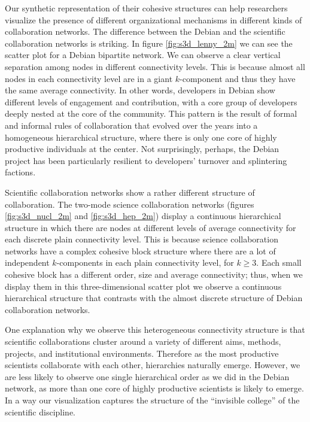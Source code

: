 Our synthetic representation of their cohesive structures can help researchers visualize the presence of different organizational mechanisms in different kinds of collaboration networks. The difference between the Debian and the scientific collaboration networks is striking. In figure \ref{fig:s3d_lenny_2m} we can see the scatter plot for a Debian bipartite network. We can observe a clear vertical separation among nodes in different connectivity levels. This is because almost all nodes in each connectivity level are in a giant $k$-component and thus they have the same average connectivity. In other words, developers in Debian show different levels of engagement and contribution, with a core group of developers deeply nested at the core of the community.  This pattern is the result of formal and informal rules of collaboration that evolved over the years \citep{ferraro:2007} into a homogeneous hierarchical structure, where there is only one core of highly productive individuals at the center. Not surprisingly, perhaps, the Debian project has been particularly resilient to developers' turnover and splintering factions.

Scientific collaboration networks show a rather different structure of collaboration. The two-mode science collaboration networks (figures \ref{fig:s3d_nucl_2m} and \ref{fig:s3d_hep_2m}) display a continuous hierarchical structure in which there are nodes at different levels of average connectivity for each discrete plain connectivity level. This is because science collaboration networks have a complex cohesive block structure where there are a lot of independent $k$-components in each plain connectivity level, for $k \ge 3$. Each small cohesive block has a different order, size and average connectivity; thus, when we display them in this three-dimensional scatter plot we observe a continuous hierarchical structure that contrasts with the almost discrete structure of Debian collaboration networks.

One explanation why we observe this heterogeneous connectivity structure is that scientific collaborations cluster around a variety of different aims, methods, projects, and institutional environments. Therefore as the most productive scientists collaborate with each other, hierarchies naturally emerge. However, we are less likely to observe one single hierarchical order as we did in the Debian network, as more than one core of highly productive scientists is likely to emerge. In a way our visualization captures the structure of the ``invisible college'' of the scientific discipline.

